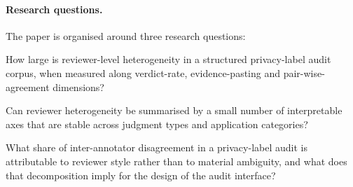 \documentclass[11pt,a4paper]{article}
\begin{document}
\paragraph{Research questions.}
The paper is organised around three research questions:
%
\begin{description}[leftmargin=1.5em,style=nextline]
\item[\textbf{RQ1}]
       How large is reviewer-level heterogeneity in a structured
       privacy-label audit corpus, when measured along verdict-rate,
       evidence-pasting and pair-wise-agreement dimensions?
\item[\textbf{RQ2}]
       Can reviewer heterogeneity be summarised by a small number of
       interpretable axes that are stable across judgment types and
       application categories?
\item[\textbf{RQ3}]
       What share of inter-annotator disagreement in a privacy-label
       audit is attributable to reviewer style rather than to material
       ambiguity, and what does that decomposition imply for the design
       of the audit interface?
\end{description}
\end{document}
